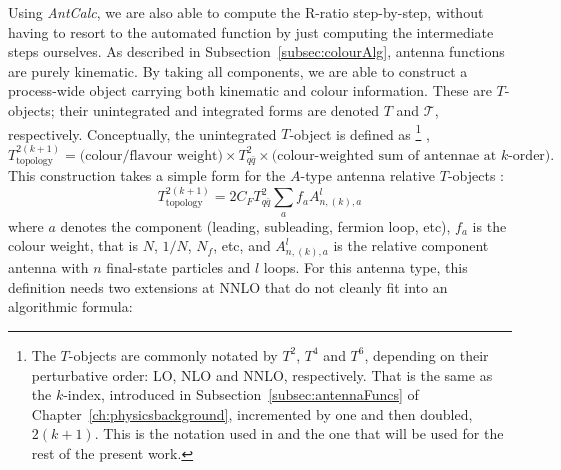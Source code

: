 Using \textit{AntCalc}, we are also able to compute the R-ratio step-by-step, without
having to resort to the automated function by just computing the intermediate steps
ourselves. As described in Subsection~\ref{subsec:colourAlg}, antenna functions are purely
kinematic. By taking all components, we are able to construct a process-wide
object carrying both kinematic and colour information. These are $T$-objects; their unintegrated
and integrated forms are denoted $T$ and $\mathcal T$, respectively. Conceptually,
the unintegrated $T$-object is defined as
\footnote{The $T$-objects are commonly notated by $T^2$, $T^4$ and $T^6$, depending
on their perturbative order: LO, NLO and NNLO, respectively. That is the same as
the $k$-index, introduced in Subsection~\ref{subsec:antennaFuncs} of Chapter~\ref{ch:physicsbackground}, incremented by one
and then doubled, $2(k+1)$. This
is the notation used in \cite{Gehrmann-DeRidder:2004ttg} and the one that will be
used for the rest of the present work.}
,
\begin{equation}
    T_\text{topology}^{2(k+1)}=\text{(colour/flavour weight)}\times T_{q\bar q}^2\times\text{(colour-weighted sum of antennae at $k$-order)}.
\end{equation}
This construction takes a simple form for the $A$-type antenna relative
$T$-objects \cite{Gehrmann-DeRidder:2005btv}:
\begin{equation}\label{eq:ATypeTObj}
    T_\text{topology}^{2(k+1)}=2C_F T_{q\bar q}^2\sum_{a} f_aA_{n, (k), a}^l
\end{equation}
where $a$ denotes the component (leading, subleading, fermion loop, etc), $f_a$
is the colour weight, that is $N$, $1/N$, $N_f$, etc, and $A_{n, (k), a}^l$ is the
relative component antenna with $n$ final-state particles and $l$ loops. For this
antenna type, this definition needs two extensions at NNLO that do not cleanly
fit into an algorithmic formula:
